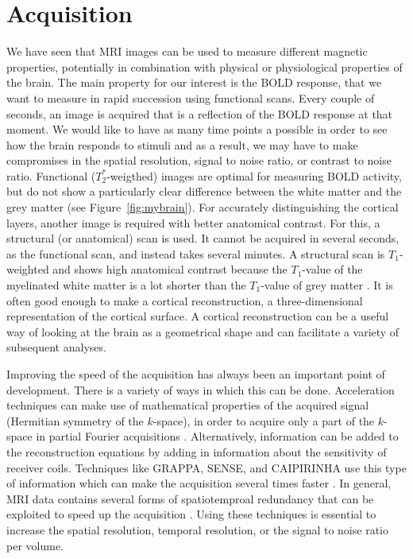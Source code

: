 \section*{Acquisition}
We have seen that MRI images can be used to measure different magnetic properties, potentially in combination with physical or physiological properties of the brain. The main property for our interest is the BOLD response, that we want to measure in rapid succession using functional scans. Every couple of seconds, an image is acquired that is a reflection of the BOLD response at that moment. We would like to have as many time points a possible in order to see how the brain responds to stimuli and as a result, we may have to make compromises in the spatial resolution, signal to noise ratio, or contrast to noise ratio. Functional ($T_2^*$-weigthed) images are optimal for measuring BOLD activity, but do not show a particularly clear difference between the white matter and the grey matter (see Figure~\ref{fig:mybrain}). For accurately distinguishing the cortical layers, another image is required with better anatomical contrast. For this, a structural (or anatomical) scan is used. It cannot be acquired in several seconds, as the functional scan, and instead takes several minutes. A structural scan is $T_1$-weighted and shows high anatomical contrast because the $T_1$-value of the myelinated white matter is a lot shorter than the $T_1$-value of grey matter \cite{Wansapura1999}. It is often good enough to make a cortical reconstruction, a three-dimensional representation of the cortical surface. A cortical reconstruction can be a useful way of looking at the brain as a geometrical shape and can facilitate a variety of subsequent analyses.


Improving the speed of the acquisition has always been an important point of development. There is a variety of ways in which this can be done. Acceleration techniques can make use of mathematical properties of the acquired signal (Hermitian symmetry of the $k$-space), in order to acquire only a part of the $k$-space in partial Fourier acquisitions \cite{Feinberg1986}. Alternatively, information can be added to the reconstruction equations by adding in information about the sensitivity of receiver coils. Techniques like GRAPPA, SENSE, and CAIPIRINHA use this type of information which can make the acquisition several times faster \cite{Setsompop2016}. In general, MRI data contains several forms of spatiotemproal redundancy that can be exploited to speed up the acquisition \cite{Tsao2012}. Using these techniques is essential to increase the spatial resolution, temporal resolution, or the signal to noise ratio per volume.

